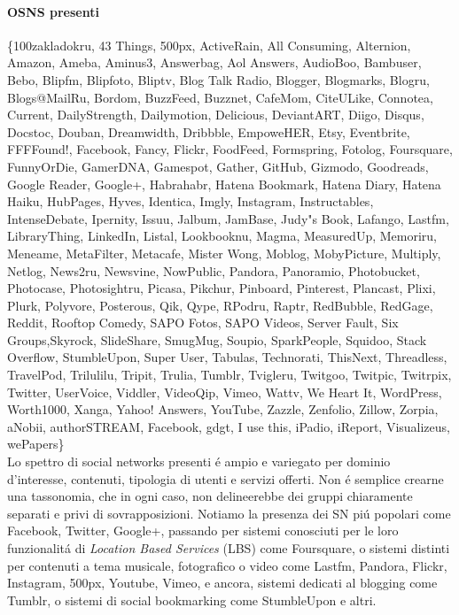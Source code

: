 \paragraph{OSNS presenti}
\{100zakladokru, 43 Things, 500px, ActiveRain, All Consuming, Alternion, Amazon, Ameba, Aminus3, Answerbag, Aol Answers, AudioBoo, Bambuser, Bebo, Blipfm, Blipfoto, Bliptv, Blog Talk Radio, Blogger, Blogmarks, Blogru, Blogs@MailRu, Bordom, BuzzFeed, Buzznet, CafeMom, CiteULike, Connotea, Current, DailyStrength, Dailymotion, Delicious, DeviantART, Diigo, Disqus, Docstoc, Douban, Dreamwidth, Dribbble, EmpoweHER, Etsy, Eventbrite, FFFFound!, Facebook, Fancy, Flickr, FoodFeed, Formspring, Fotolog, Foursquare, FunnyOrDie, GamerDNA, Gamespot, Gather, GitHub, Gizmodo, Goodreads, Google Reader, Google+, Habrahabr, Hatena Bookmark, Hatena Diary, Hatena Haiku, HubPages, Hyves, Identica, Imgly, Instagram, Instructables, IntenseDebate, Ipernity, Issuu, Jalbum, JamBase, Judy"s Book, Lafango, Lastfm, LibraryThing, LinkedIn, Listal, Lookbooknu, Magma, MeasuredUp, Memoriru, Meneame, MetaFilter, Metacafe, Mister Wong, Moblog, MobyPicture, Multiply, Netlog, News2ru, Newsvine, NowPublic, Pandora, Panoramio, Photobucket, Photocase, Photosightru, Picasa, Pikchur, Pinboard, Pinterest, Plancast, Plixi, Plurk, Polyvore, Posterous, Qik, Qype, RPodru, Raptr, RedBubble, RedGage, Reddit, Rooftop Comedy, SAPO Fotos, SAPO Videos, Server Fault, Six Groups,Skyrock, SlideShare, SmugMug, Soupio, SparkPeople, Squidoo, Stack Overflow, StumbleUpon, Super User, Tabulas, Technorati, ThisNext, Threadless, TravelPod, Trilulilu, Tripit, Trulia, Tumblr, Tvigleru, Twitgoo, Twitpic, Twitrpix, Twitter, UserVoice, Viddler, VideoQip, Vimeo, Wattv, We Heart It, WordPress, Worth1000, Xanga, Yahoo! Answers, YouTube, Zazzle, Zenfolio, Zillow, Zorpia, aNobii, authorSTREAM, Facebook, gdgt, I use this, iPadio, iReport, Visualizeus, wePapers\} \\

Lo spettro di social networks presenti é ampio e variegato per dominio d'interesse, contenuti, tipologia di utenti e servizi offerti. Non é semplice crearne una tassonomia, che in ogni caso, non delineerebbe dei gruppi chiaramente separati e privi di sovrapposizioni. Notiamo la presenza dei SN piú popolari come Facebook, Twitter, Google+,
passando per sistemi conosciuti per le loro funzionalitá di \textit{Location Based Services} (LBS) come Foursquare, o sistemi distinti per contenuti a tema musicale, fotografico o video come Lastfm, Pandora, Flickr, Instagram, 500px, Youtube, Vimeo, e ancora, sistemi dedicati al blogging come Tumblr, o sistemi di social bookmarking come StumbleUpon e altri.

